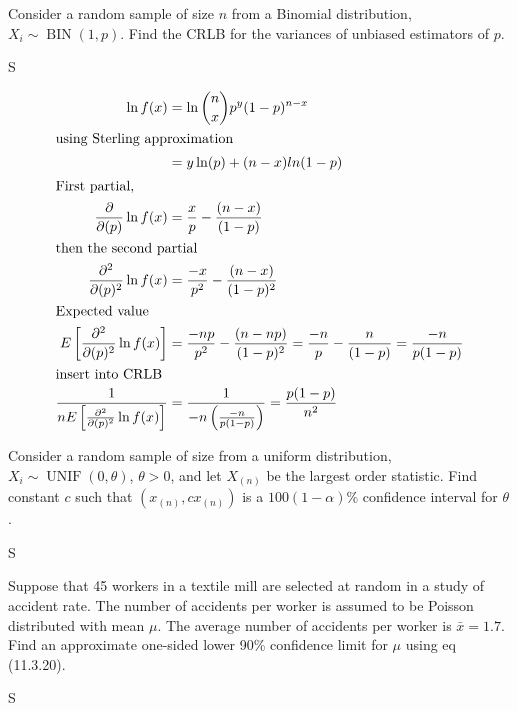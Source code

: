 \documentclass[answers]{exam}
\begin{document}
\begin{questions}
\question 
Consider a random sample of size \(n\) from a Binomial distribution,
\(X_i\sim\operatorname{BIN}(1,p)\). 
Find the CRLB for the variances of unbiased estimators of \(p\).
\begin{solution}
	S
	
	\begin{align*}
		\ln f(x) &= \ln\binom{n}{x}p^y(1-p)^{n-x} \\
		\intertext{using Sterling approximation}
			&= y \ln(p) + (n-x)ln(1-p) \\
	\intertext{First partial,}
		\frac{\partial}{\partial(p)}\ln f(x) &= \frac{x}{p} -\frac{(n-x)}{(1-p)} \\
	\intertext{then the second partial}
		\frac{\partial^2}{\partial(p)^2}\ln f(x)
			&= \frac{-x}{p^2} -\frac{(n-x)}{(1-p)^2} \\
	\intertext{Expected value}
		E\left[\frac{\partial^2}{\partial(p)^2}\ln f(x)\right]
		&= \frac{-np}{p^2} -\frac{(n-np)}{(1-p)^2}
		= \frac{-n}{p} -\frac{n}{(1-p)} 
		= \frac{-n}{p(1-p)} \\
	\intertext{insert into CRLB}
		\frac{1}{nE\left[\frac{\partial^2}{\partial(p)^2}\ln f(x)\right]}
		&= \frac{1}{-n\left(\frac{-n}{p(1-p)}\right)}
		= \frac{p(1-p)}{n^2}
	\end{align*}
\end{solution}

\question 
Consider a random sample of size from a uniform distribution,
\(X_i\sim\operatorname{UNIF}(0,\theta)\), \(\theta>0\),
and let \(X_{(n)}\) be the largest order statistic. 
Find constant \(c\) such that \((x_{(n)},cx_{(n)})\) is a \(100(1-\alpha)\%\) 
confidence interval for \(\theta\).
\begin{solution}
	S
\end{solution}

\question 
Suppose that 45 workers in a textile mill are selected at random in a study of accident rate. 
The number of accidents per worker is assumed to be Poisson distributed with mean \(\mu\). 
The average number of accidents per worker is \(\bar{x}=1.7\).
Find an approximate one-sided lower 90\% confidence limit for \(\mu\) 
using eq (11.3.20).
\begin{solution}
	S
\end{solution}


\end{questions}
\end{document}
